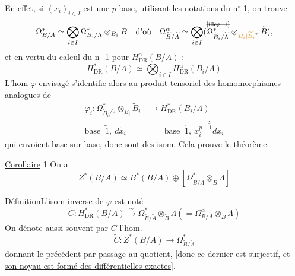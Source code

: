 En effet, si $(x_i)_{i\in I}$ est une $p$-base, utilisant les notations du n$^\circ$ 1, on trouve 
\[
 \Omega^*_{B/A}\simeq\bigotimes_{i\in I}\Omega^*_{B_i/\Lambda}\otimes_{B_i}B
 \quad\text{d'où}\quad
 \Omega^\alpha_{\widetilde B/\widetilde A}\simeq\bigotimes_{i\in I}
 (\overset{\deleted{\illegible{1}}}{\Omega^*_{\widetilde B_i/\widetilde\Lambda}}\otimes_{\unsure{B_i|\widetilde B_i}}\widetilde B),
\]
et en vertu du calcul du n$^\circ$ 1 pour $H^\alpha_{\mathrm{DR}}(B/A)$ :
\[
 H^*_{\mathrm{DR}}(B/A)\simeq\bigotimes_{i\in I}H^\alpha_{\mathrm{DR}}(B_i/\Lambda)
\]
L'hom $\varphi$ envisagé s'identifie alors au produit tensoriel des homomorphismes analogues  de
\[
 \begin{aligned}
 \varphi_i:\Omega^*_{\widetilde B_i/\widetilde\Lambda}\otimes_{B_i}\widetilde B_i
 &\longrightarrow H^*_{\mathrm{DR}}(B_i/\Lambda)\\
 \text{base }\ \widetilde 1,\ d\widetilde x_i&\qquad
 \text{base }\ \dot{1},\ \overset{\cdot}{\overline{x_i^{p-1}dx_i}}
 \end{aligned}
\]
qui envoient base sur base, donc sont des isom. Cela prouve le théorème.

\uline{Corollaire} 1  On a
\[
 Z^*(B/A)\simeq B^*(B/A)\oplus[\Omega^*_{\widetilde B/\widetilde A}\otimes_{\widetilde B}\Lambda]
\]

\uline{Définition}\quad L'isom inverse de $\varphi$ est noté
\[
 \boxed{\widetilde C:H^*_{\mathrm{DR}}(B/A)\xrightarrow{\sim}
 \Omega^*_{\widetilde B/\widetilde A}\otimes_{\widetilde B}\Lambda}
 \boxed{(=\Omega^\alpha_{B/A}\otimes_B\Lambda)}
\]
On dénote aussi souvent par $C$ l'hom.
\[
 \widetilde C:Z^*(B/A)\longrightarrow\Omega^*_{\widetilde B/\widetilde A}
\]
donnant le précédent par passage au quotient, [donc ce dernier est \uline{surjectif}, \uline{et son noyau est formé des différentielles exactes}].

